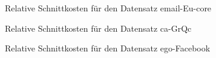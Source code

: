 \begin{figure}
    \centering
    
    \caption{Relative Schnittkosten für den Datensatz email-Eu-core\label{fig:email}}
\end{figure}

\begin{figure}
    \centering
    
    \caption{Relative Schnittkosten für den Datensatz ca-GrQc\label{fig:cagrqc}}
\end{figure}

\begin{figure}
    \centering
    
    \caption{Relative Schnittkosten für den Datensatz ego-Facebook\label{fig:facebook}}
\end{figure}

